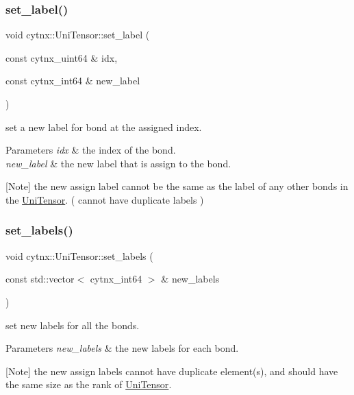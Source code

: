 \subsubsection{\texorpdfstring{set\+\_\+label()}{set\_label()}}
{\footnotesize\ttfamily void cytnx\+::\+Uni\+Tensor\+::set\+\_\+label (\begin{DoxyParamCaption}\item[{const cytnx\+\_\+uint64 \&}]{idx,  }\item[{const cytnx\+\_\+int64 \&}]{new\+\_\+label }\end{DoxyParamCaption})\hspace{0.3cm}{\ttfamily [inline]}}



set a new label for bond at the assigned index. 


\begin{DoxyParams}{Parameters}
{\em idx} & the index of the bond. \\
\hline
{\em new\+\_\+label} & the new label that is assign to the bond.\\
\hline
\end{DoxyParams}
\mbox{[}Note\mbox{]} the new assign label cannot be the same as the label of any other bonds in the \hyperlink{classcytnx_1_1UniTensor}{Uni\+Tensor}. ( cannot have duplicate labels ) \mbox{\label{classcytnx_1_1UniTensor_a6e17d3849392171f61d6bebd5ac2b3f2}} 
\subsubsection{\texorpdfstring{set\+\_\+labels()}{set\_labels()}}
{\footnotesize\ttfamily void cytnx\+::\+Uni\+Tensor\+::set\+\_\+labels (\begin{DoxyParamCaption}\item[{const std\+::vector$<$ cytnx\+\_\+int64 $>$ \&}]{new\+\_\+labels }\end{DoxyParamCaption})\hspace{0.3cm}{\ttfamily [inline]}}



set new labels for all the bonds. 


\begin{DoxyParams}{Parameters}
{\em new\+\_\+labels} & the new labels for each bond.\\
\hline
\end{DoxyParams}
\mbox{[}Note\mbox{]} the new assign labels cannot have duplicate element(s), and should have the same size as the rank of \hyperlink{classcytnx_1_1UniTensor}{Uni\+Tensor}. \mbox{\label{classcytnx_1_1UniTensor_ad2ee7e756d5fc9e05faf814b99151544}} 
